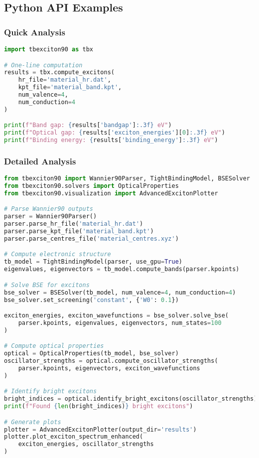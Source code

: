 \documentclass[11pt,a4paper]{article}
\begin{document}
\subsection{Python API Examples}

\subsubsection{Quick Analysis}

\begin{lstlisting}[language=Python]
import tbexciton90 as tbx

# One-line computation
results = tbx.compute_excitons(
    hr_file='material_hr.dat',
    kpt_file='material_band.kpt',
    num_valence=4,
    num_conduction=4
)

print(f"Band gap: {results['bandgap']:.3f} eV")
print(f"Optical gap: {results['exciton_energies'][0]:.3f} eV")
print(f"Binding energy: {results['binding_energy']:.3f} eV")
\end{lstlisting}

\subsubsection{Detailed Analysis}

\begin{lstlisting}[language=Python]
from tbexciton90 import Wannier90Parser, TightBindingModel, BSESolver
from tbexciton90.solvers import OpticalProperties
from tbexciton90.visualization import AdvancedExcitonPlotter

# Parse Wannier90 outputs
parser = Wannier90Parser()
parser.parse_hr_file('material_hr.dat')
parser.parse_kpt_file('material_band.kpt')
parser.parse_centres_file('material_centres.xyz')

# Compute electronic structure
tb_model = TightBindingModel(parser, use_gpu=True)
eigenvalues, eigenvectors = tb_model.compute_bands(parser.kpoints)

# Solve BSE for excitons
bse_solver = BSESolver(tb_model, num_valence=4, num_conduction=4)
bse_solver.set_screening('constant', {'W0': 0.1})

exciton_energies, exciton_wavefunctions = bse_solver.solve_bse(
    parser.kpoints, eigenvalues, eigenvectors, num_states=100
)

# Compute optical properties
optical = OpticalProperties(tb_model, bse_solver)
oscillator_strengths = optical.compute_oscillator_strengths(
    parser.kpoints, eigenvectors, exciton_wavefunctions
)

# Identify bright excitons
bright_indices = optical.identify_bright_excitons(oscillator_strengths)
print(f"Found {len(bright_indices)} bright excitons")

# Generate plots
plotter = AdvancedExcitonPlotter(output_dir='results')
plotter.plot_exciton_spectrum_enhanced(
    exciton_energies, oscillator_strengths
)
\end{lstlisting}
\end{document}
